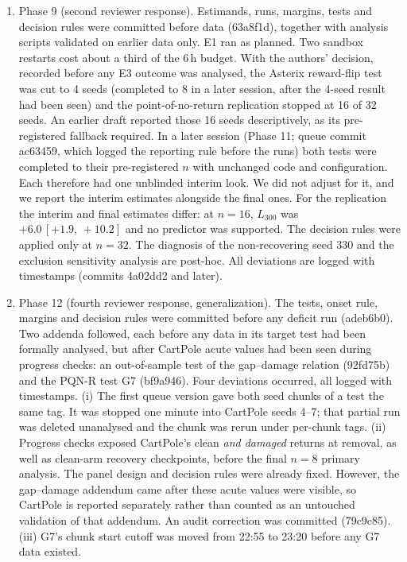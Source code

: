 \documentclass[10pt]{article} %
\newcommand{\ci}[2]{\,[#1,\,#2]}
\begin{document}
\begin{enumerate}[label=(\arabic*)]
\item Phase 9 (second reviewer response). Estimands, runs, margins, tests and decision rules were committed before data (63a8f1d), together with analysis scripts validated on earlier data only. E1 ran as planned. Two sandbox restarts cost about a third of the 6\,h budget. With the authors' decision, recorded before any E3 outcome was analysed, the Asterix reward-flip test was cut to 4 seeds (completed to 8 in a later session, after the 4-seed result had been seen) and the point-of-no-return replication stopped at 16 of 32 seeds. An earlier draft reported those 16 seeds descriptively, as its pre-registered fallback required. In a later session (Phase 11; queue commit ac63459, which logged the reporting rule before the runs) both tests were completed to their pre-registered $n$ with unchanged code and configuration. Each therefore had one unblinded interim look. We did not adjust for it, and we report the interim estimates alongside the final ones. For the replication the interim and final estimates differ: at $n=16$, $L_{300}$ was $+6.0\ci{+1.9}{+10.2}$ and no predictor was supported. The decision rules were applied only at $n=32$. The diagnosis of the non-recovering seed 330 and the exclusion sensitivity analysis are post-hoc. All deviations are logged with timestamps (commits 4a02dd2 and later).
\item Phase 12 (fourth reviewer response, generalization). The tests, onset rule, margins and decision rules were committed before any deficit run (adeb6b0). Two addenda followed, each before any data in its target test had been formally analysed, but after CartPole acute values had been seen during progress checks: an out-of-sample test of the gap--damage relation (92fd75b) and the PQN-R test G7 (bf9a946). Four deviations occurred, all logged with timestamps.
(i) The first queue version gave both seed chunks of a test the same tag. It was stopped one minute into CartPole seeds 4--7; that partial run was deleted unanalysed and the chunk was rerun under per-chunk tags.
(ii) Progress checks exposed CartPole's clean \emph{and damaged} returns at removal, as well as clean-arm recovery checkpoints, before the final $n=8$ primary analysis. The panel design and decision rules were already fixed. However, the gap--damage addendum came after these acute values were visible, so CartPole is reported separately rather than counted as an untouched validation of that addendum. An audit correction was committed (79c9c85).
(iii) G7's chunk start cutoff was moved from 22:55 to 23:20 before any G7 data existed.

\end{enumerate}
\end{document}
